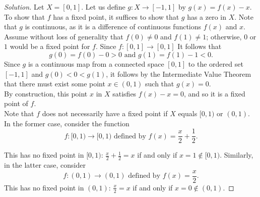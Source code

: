 \documentclass[11pt]{article}
\newenvironment{solution}
  {\renewcommand\qedsymbol{$\blacksquare$}\begin{proof}[Solution]}
  {\end{proof}}
\begin{document}
\begin{solution}
Let $X = [0, 1]$. Let us define $g\colon X \rightarrow [-1, 1]$ by $g(x) = f(x) - x$. To show that $f$ has a fixed point, it suffices to show that $g$ has a zero in $X$. 
Note that $g$ is continuous, as it is a difference of continuous functions $f(x)$ and $x$. \\

Assume without loss of generality that $f(0) \neq 0$ and $f(1) \neq 1$; otherwise, $0$ or $1$ would be a fixed point for $f$. 
Since $f\colon [0, 1] \rightarrow [0, 1]$ It follows that
\[
	g(0) = f(0) - 0 > 0 \text{ and } g(1) = f(1) - 1 < 0.
\]
Since $g$ is a continuous map from a connected space $[0, 1]$ to the ordered set $[-1, 1]$ and $g(0) < 0 < g(1)$, 
it follows by the Intermediate Value Theorem that there must exist some point $x \in (0, 1)$ such that $g(x) = 0$. \\

By construction, this point $x$ in $X$ satisfies $f(x) - x = 0$, and so it is a fixed point of $f$. \\

Note that $f$ does not necessarily have a fixed point if $X$ equals $[0, 1)$ or $(0, 1)$. In the former case, consider the function
\[
	f\colon [0, 1) \rightarrow [0, 1) \text{ defined by } f(x) = \frac{x}{2} + \frac{1}{2}.
\]

This has no fixed point in $[0, 1)$: $\frac{x}{2} + \frac{1}{2} = x$ if and only if $x = 1 \notin [0, 1)$. Similarly, 
in the latter case, consider
\[
	f\colon (0, 1) \rightarrow (0,1) \text{ defined by } f(x) = \frac{x}{2}.
\]
This has no fixed point in $(0, 1)$: $\frac{x}{2} = x$ if and only if $x = 0 \notin (0, 1)$. 
\end{solution}
\end{document}
